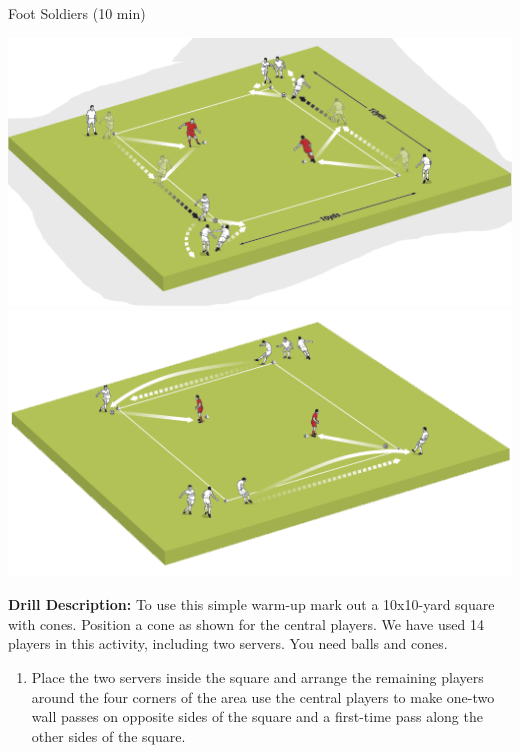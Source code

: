 \begin{evenBlock}{Foot Soldiers (10 min)}

\begin{minipage}[t]{\linewidth}
    \centering
    
    \begin{minipage}{.4\linewidth} %
        \centering
        \includegraphics[width=\textwidth]{../img/Trimmed/FootSoldiers1}
        \vspace{6pt}
        \includegraphics[width=\textwidth]{../img/Trimmed/Footsoldiers2}
    \end{minipage}
    \hspace{0.05\linewidth}
    \begin{minipage}{.5\linewidth} %
        \textbf{Drill Description:}
        To use this simple warm-up mark out a 10x10-yard square with cones. Position a cone as shown for the central players. We have used 14 players in this activity, including two servers. You need balls and cones.
        \begin{enumerate}
        \setlength{\itemsep}{0pt}
        \setlength{\parskip}{0pt}
        \setlength{\parsep}{0pt}
        \item Place the two servers inside the square and arrange the remaining players around the four corners of the area use the central players to make one-two wall passes on opposite sides of the square and a first-time pass along the other sides of the square.

\end{enumerate}
\end{minipage}
\end{minipage}
\end{evenBlock}
